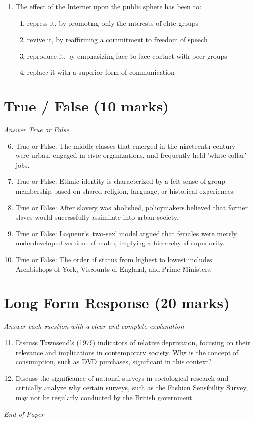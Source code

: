 \documentclass[12pt]{article}
\begin{document}
\begin{enumerate}[label=\arabic*.]
\begin{enumerate}[label=(\alph*)]
    \item a decline in the birth rate, greater life expectancy, and an ageing population
\end{enumerate}
\item The effect of the Internet upon the public sphere has been to:
\begin{enumerate}[label=(\alph*)]
    \item repress it, by promoting only the interests of elite groups
    \item revive it, by reaffirming a commitment to freedom of speech
    \item reproduce it, by emphasizing face-to-face contact with peer groups
    \item replace it with a superior form of communication
\end{enumerate}
\end{enumerate}

\section*{True / False (10 marks)}
\textit{Answer True or False}
\begin{enumerate}[label=\arabic*.]
\setcounter{enumi}{5}
\item True or False: The middle classes that emerged in the nineteenth century were urban, engaged in civic organizations, and frequently held 'white collar' jobs.
\item True or False: Ethnic identity is characterized by a felt sense of group membership based on shared religion, language, or historical experiences.
\item True or False: After slavery was abolished, policymakers believed that former slaves would successfully assimilate into urban society.
\item True or False: Laqueur's 'two-sex' model argued that females were merely underdeveloped versions of males, implying a hierarchy of superiority.
\item True or False: The order of status from highest to lowest includes Archbishops of York, Viscounts of England, and Prime Ministers.
\end{enumerate}

\section*{Long Form Response (20 marks)}
\textit{Answer each question with a clear and complete explanation.}
\begin{enumerate}[label=\arabic*.]
\setcounter{enumi}{10}
\item Discuss Townsend's (1979) indicators of relative deprivation, focusing on their relevance and implications in contemporary society. Why is the concept of consumption, such as DVD purchases, significant in this context?
\item Discuss the significance of national surveys in sociological research and critically analyze why certain surveys, such as the Fashion Sensibility Survey, may not be regularly conducted by the British government.
\end{enumerate}

\vfill
\noindent\textit{End of Paper}
\end{document}
